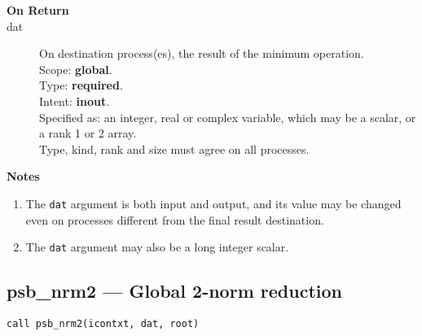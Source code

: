 \begin{description}
\item[\bf On Return]
\item[dat] On destination process(es), the result of the minimum operation.\\
Scope: {\bf global}.\\
Type: {\bf required}.\\
Intent: {\bf inout}.\\
Specified as: an integer, real or complex variable, which may be a
scalar, or a rank 1 or 2 array. \\
Type, kind, rank and size must agree on all processes.
\end{description}


{\par\noindent\large\bfseries Notes}
\begin{enumerate}
\item The \verb|dat| argument is both input and output, and its
  value may be changed even on processes different from the final
  result destination.
\item The \verb|dat| argument may also be a long integer scalar.
\end{enumerate}

\clearpage\subsection*{psb\_nrm2 --- Global 2-norm reduction}

\begin{verbatim}
call psb_nrm2(icontxt, dat, root)
\end{verbatim}

